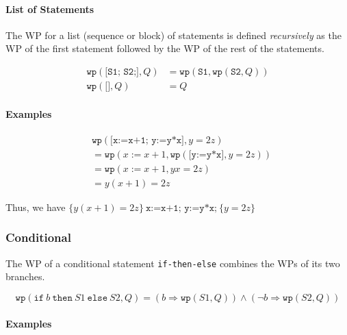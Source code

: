 \documentclass[oneside,11pt,dvipsnames]{book}
\renewcommand{\implies}{\Rightarrow}
\newcommand{\code}[1]{\texttt{#1}}
\begin{document}
\paragraph{List of Statements}\label{list-of-statements}

The WP for a list (sequence or block) of statements is defined \emph{recursively} as the WP of the first statement followed by the WP of the rest of the statements.  

\begin{align}\label{eq:wp-sequence}
    \code{wp}(\code{[S1; S2;]}, Q) &= \code{wp}(\code{S1}, \code{wp}(\code{S2}, Q))\\
    \code{wp}(\code{[]}, Q) &= Q
\end{align}

%
\paragraph{Examples}

\begin{equation*}
\begin{split}
    &\code{wp}(\code{[x:=x+1; y:=y*x]}, y=2z) \\
    &= \code{wp}  (x:=x+1, \code{wp}(\code{[y:=y*x]}, y=2z))\\
    &= \code{wp}(x:=x+1, yx=2z)\\
    &= y(x+1)=2z
\end{split}
\end{equation*}


Thus, we have $\{y(x+1)=2z\} ~ \code{x:=x+1; y:=y*x;} ~ \{y=2z\}$

\subsubsection{Conditional}\label{conditional}

The WP of a conditional statement \code{if-then-else} combines the WPs of its two branches.

\begin{equation}\label{eq:wp-conditional}
\code{wp}(\code{if}~b~\code{then}~S1~\code{else}~S2, Q)  =  (b \implies \code{wp}(S1,Q))  \land  (\neg b \implies \code{wp}(S2, Q))
\end{equation}

\paragraph{Examples}
\end{document}
